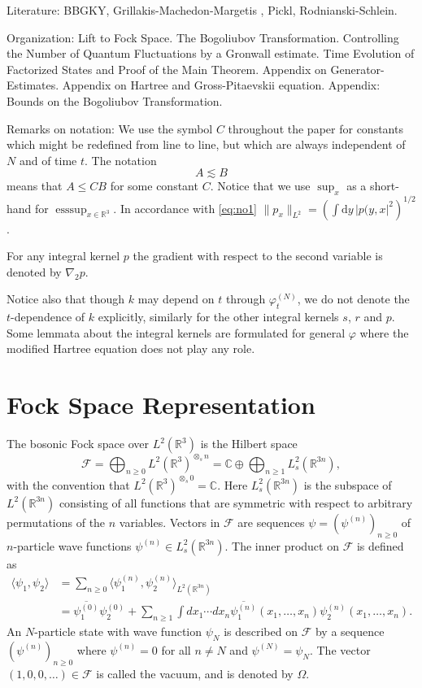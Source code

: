 \documentclass[11pt,a4paper,draft,DIV11]{scrartcl}	%
\newcommand{\R}{\mathds{R}}
\newcommand{\di}{\textrm{d}}		%
\newcommand{\Rbb}{\mathbb{R}}		%
\newcommand{\norm}[1]{\lVert#1\rVert}	%
\newcommand{\ph}{\varphi_t^{(N)}}	%
\newcommand{\eqr}[1]{\eqref{eq:#1}}			%
\begin{document}
Literature: BBGKY, Grillakis-Machedon-Margetis \cite{GMM2010}, Pickl, Rodnianski-Schlein.

Organization: Lift to Fock Space. The Bogoliubov Transformation. Controlling the Number of Quantum Fluctuations by a Gronwall estimate. Time Evolution of Factorized States and Proof of the Main Theorem. Appendix on Generator-Estimates. Appendix on Hartree and Gross-Pitaevskii equation. Appendix: Bounds on the Bogoliubov Transformation.

Remarks on notation: We use the symbol $C$ throughout the paper for constants which might be redefined from line to line, but which are always independent of $N$ and of time $t$.
The notation
\[
  A \apprle B
\]
means that $A \le C B$ for some constant $C$.
Notice that we use $\sup_x$ as a short-hand for $\operatorname{esssup}_{x\in \Rbb^3}$. In accordance with \eqr{no1} $\norm{p_x}_{L^2} = \left( \int \di y\, \lvert p(y,x\rvert^2 \right)^{1/2}$.

For any integral kernel $p$ the gradient with respect to the second variable is denoted by $\nabla_2 p$.

Notice also that though $k$ may depend on $t$ through $\ph$, we do not denote the $t$-dependence of $k$ explicitly, similarly for the other integral kernels $s$, $r$ and $p$. Some lemmata about the integral kernels are formulated for general $\varphi$ where the modified Hartree equation does not play any role.

\section{Fock Space Representation}
The bosonic Fock space over $L^2(\R^3)$ is the Hilbert space
\[
  \mathcal{F} = \bigoplus_{n \ge 0} L^2(\R^3)^{\otimes_s n} = \mathds{C}
  \oplus \bigoplus_{n \ge 1} L^2_s(\R^{3n}),
\]
with the convention that $L^2(\R^3)^{\otimes_s 0} = \mathds{C}$. Here
$L^2_s(\R^{3n})$ is the subspace of $L^2(\R^{3n})$ consisting of all functions
that are symmetric with respect to arbitrary permutations of the $n$
variables. Vectors in $\mathcal{F}$ are sequences $\psi = (\psi^{(n)})_{n
\ge 0}$ of $n$-particle wave functions $\psi^{(n)} \in L^2_s(\R^{3n})$. The
inner product on $\mathcal{F}$ is defined as
\begin{align*}
  \langle \psi_1, \psi_2 \rangle & = \sum_{n \ge 0} \langle \psi_1^{(n)},
  \psi_2^{(n)} \rangle_{L^2(\R^{3n})} \\
  & = \overline{\psi_1^{(0)}} \psi_2^{(0)} + \sum_{n \ge 1} \int dx_1 \cdots
  dx_n \overline{\psi_1^{(n)}}(x_1, \dots, x_n) \psi_2^{(n)}(x_1, \dots, x_n).
\end{align*}
An $N$-particle state with wave function $\psi_N$ is described on
$\mathcal{F}$ by a sequence $(\psi^{(n)})_{n \ge 0}$ where $\psi^{(n)} =
0$ for all $n \neq N$ and $\psi^{(N)} = \psi_N$. The vector $(1, 0, 0, \dots
) \in \mathcal{F}$ is called the vacuum, and is denoted by $\Omega$.
\end{document}
